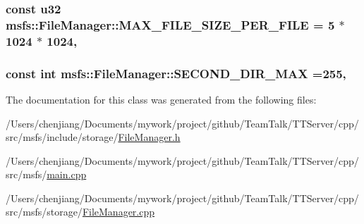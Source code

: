 \subsubsection[{M\+A\+X\+\_\+\+F\+I\+L\+E\+\_\+\+S\+I\+Z\+E\+\_\+\+P\+E\+R\+\_\+\+F\+I\+L\+E}]{\setlength{\rightskip}{0pt plus 5cm}const {\bf u32} msfs\+::\+File\+Manager\+::\+M\+A\+X\+\_\+\+F\+I\+L\+E\+\_\+\+S\+I\+Z\+E\+\_\+\+P\+E\+R\+\_\+\+F\+I\+L\+E = 5 $\ast$ 1024 $\ast$ 1024\hspace{0.3cm}{\ttfamily [static]}, {\ttfamily [private]}}\label{classmsfs_1_1_file_manager_a67c779dc06afccdc92bb3f5fbd52b540}
\hypertarget{classmsfs_1_1_file_manager_a8d45d9f54bb93a6f1f4520f05fb74086}{}
\subsubsection[{S\+E\+C\+O\+N\+D\+\_\+\+D\+I\+R\+\_\+\+M\+A\+X}]{\setlength{\rightskip}{0pt plus 5cm}const int msfs\+::\+File\+Manager\+::\+S\+E\+C\+O\+N\+D\+\_\+\+D\+I\+R\+\_\+\+M\+A\+X =255\hspace{0.3cm}{\ttfamily [static]}, {\ttfamily [private]}}\label{classmsfs_1_1_file_manager_a8d45d9f54bb93a6f1f4520f05fb74086}


The documentation for this class was generated from the following files\+:\begin{DoxyCompactItemize}
\item 
/\+Users/chenjiang/\+Documents/mywork/project/github/\+Team\+Talk/\+T\+T\+Server/cpp/src/msfs/include/storage/\hyperlink{_file_manager_8h}{File\+Manager.\+h}\item 
/\+Users/chenjiang/\+Documents/mywork/project/github/\+Team\+Talk/\+T\+T\+Server/cpp/src/msfs/\hyperlink{main_8cpp}{main.\+cpp}\item 
/\+Users/chenjiang/\+Documents/mywork/project/github/\+Team\+Talk/\+T\+T\+Server/cpp/src/msfs/storage/\hyperlink{_file_manager_8cpp}{File\+Manager.\+cpp}\end{DoxyCompactItemize}
